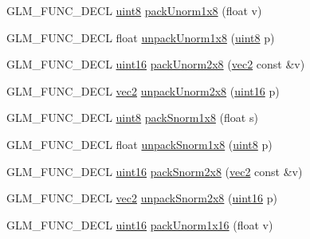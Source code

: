 \begin{DoxyCompactItemize}
\item 
G\-L\-M\-\_\-\-F\-U\-N\-C\-\_\-\-D\-E\-C\-L \hyperlink{group__gtc__type__precision_ga1a7dcd8aac97cc8020817c94049deff2}{uint8} \hyperlink{group__gtc__packing_ga2f9963e5d762b10085b280d3662017ba}{pack\-Unorm1x8} (float v)
\item 
G\-L\-M\-\_\-\-F\-U\-N\-C\-\_\-\-D\-E\-C\-L float \hyperlink{group__gtc__packing_ga32f3f2642df2ea87449d59fb614a8305}{unpack\-Unorm1x8} (\hyperlink{group__gtc__type__precision_ga1a7dcd8aac97cc8020817c94049deff2}{uint8} p)
\item 
G\-L\-M\-\_\-\-F\-U\-N\-C\-\_\-\-D\-E\-C\-L \hyperlink{group__gtc__type__precision_gad8c2939e1fdd8e5828b31d95c52255d5}{uint16} \hyperlink{group__gtc__packing_ga833288fc0d4a79f19d0db75a6843bfe6}{pack\-Unorm2x8} (\hyperlink{group__core__types_gaa1618f51db67eaa145db101d8c8431d8}{vec2} const \&v)
\item 
G\-L\-M\-\_\-\-F\-U\-N\-C\-\_\-\-D\-E\-C\-L \hyperlink{group__core__types_gaa1618f51db67eaa145db101d8c8431d8}{vec2} \hyperlink{group__gtc__packing_ga96ce0c24339ee676e28a027fffd1edf6}{unpack\-Unorm2x8} (\hyperlink{group__gtc__type__precision_gad8c2939e1fdd8e5828b31d95c52255d5}{uint16} p)
\item 
G\-L\-M\-\_\-\-F\-U\-N\-C\-\_\-\-D\-E\-C\-L \hyperlink{group__gtc__type__precision_ga1a7dcd8aac97cc8020817c94049deff2}{uint8} \hyperlink{group__gtc__packing_ga26b6cd7a35c46c4b6a342f3b97b47423}{pack\-Snorm1x8} (float s)
\item 
G\-L\-M\-\_\-\-F\-U\-N\-C\-\_\-\-D\-E\-C\-L float \hyperlink{group__gtc__packing_ga6f2bebf536fbf7c8b97d4b306bb3354e}{unpack\-Snorm1x8} (\hyperlink{group__gtc__type__precision_ga1a7dcd8aac97cc8020817c94049deff2}{uint8} p)
\item 
G\-L\-M\-\_\-\-F\-U\-N\-C\-\_\-\-D\-E\-C\-L \hyperlink{group__gtc__type__precision_gad8c2939e1fdd8e5828b31d95c52255d5}{uint16} \hyperlink{group__gtc__packing_ga05d08a82923166ec7cd5d0e6154c9953}{pack\-Snorm2x8} (\hyperlink{group__core__types_gaa1618f51db67eaa145db101d8c8431d8}{vec2} const \&v)
\item 
G\-L\-M\-\_\-\-F\-U\-N\-C\-\_\-\-D\-E\-C\-L \hyperlink{group__core__types_gaa1618f51db67eaa145db101d8c8431d8}{vec2} \hyperlink{group__gtc__packing_ga27f30f0281b88e152b0895f5e2ead878}{unpack\-Snorm2x8} (\hyperlink{group__gtc__type__precision_gad8c2939e1fdd8e5828b31d95c52255d5}{uint16} p)
\item 
G\-L\-M\-\_\-\-F\-U\-N\-C\-\_\-\-D\-E\-C\-L \hyperlink{group__gtc__type__precision_gad8c2939e1fdd8e5828b31d95c52255d5}{uint16} \hyperlink{group__gtc__packing_ga60c7d915f5653559ae02c2f79a8c5c1d}{pack\-Unorm1x16} (float v)

\end{DoxyCompactItemize}
